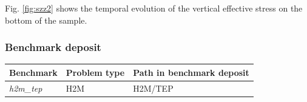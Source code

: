 Fig. \ref{fig:szz2} shows the temporal evolution of the vertical effective stress on the bottom of the sample.

\subsubsection{Benchmark deposit}

\begin{tabular}{|l|l|l|}
\hline
Benchmark & Problem type & Path in benchmark deposit \\
\hline
\emph{h2m\_tep}& H2M & H2M/TEP \\
\hline
\end{tabular} 
